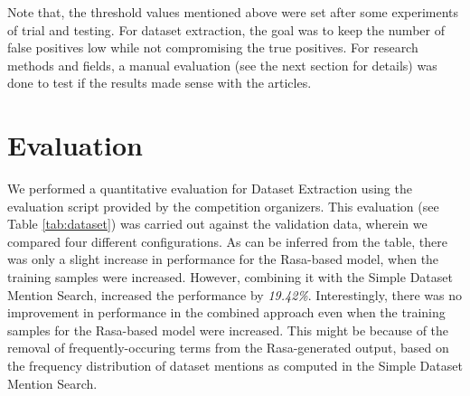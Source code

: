 \documentclass[runningheads]{llncs}
\begin{document}
	Note that, the threshold values mentioned above were set after some experiments of trial and testing. For dataset extraction, the goal was to keep the number of false positives low while not compromising the true positives. %
	For research methods and fields, a manual evaluation (see the next section for details) was done to test if the results made sense with the articles.
	
	\section{Evaluation}
	We performed a quantitative evaluation for Dataset Extraction using the evaluation script provided by the competition organizers. This evaluation (see Table \ref{tab:dataset}) was carried out against the validation data, wherein we compared four different configurations. As can be inferred from the table, %
	there was only a slight increase in performance for the Rasa-based model, when the training samples were increased. However, combining it with the Simple Dataset Mention Search, increased the performance by \emph{19.42\%}. Interestingly, there was no improvement in performance in the combined approach even when the training samples for the Rasa-based model were increased. This might be because of the removal of frequently-occuring terms from the Rasa-generated output, based on the frequency distribution of dataset mentions as computed in the Simple Dataset Mention Search.  \\
	
	
\end{document}
